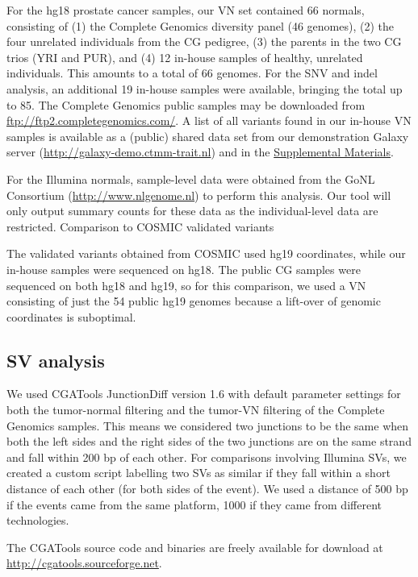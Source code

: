 For the hg18 prostate cancer samples, our VN set contained 66 normals, consisting of (1) the Complete Genomics diversity panel (46 genomes), (2) the four unrelated individuals from the CG pedigree, (3) the parents in the two CG trios (YRI and PUR), and (4) 12 in-house samples of healthy, unrelated individuals. This amounts to a total of 66 genomes. For the SNV and indel analysis, an additional 19 in-house samples were available, bringing the total up to 85. The Complete Genomics public samples may be downloaded from \url{ftp://ftp2.completegenomics.com/}. A list of all variants found in our in-house VN samples is available as a (public) shared data set from our demonstration Galaxy server (\url{http://galaxy-demo.ctmm-trait.nl}) and in the \href{https://genome.cshlp.org/content/25/9/1382/suppl/DC1}{Supplemental Materials}.

For the Illumina normals, sample-level data were obtained from the GoNL Consortium (\url{http://www.nlgenome.nl}) to perform this analysis. Our tool will only output summary counts for these data as the individual-level data are restricted.
Comparison to COSMIC validated variants

The validated variants obtained from COSMIC used hg19 coordinates, while our in-house samples were sequenced on hg18. The public CG samples were sequenced on both hg18 and hg19, so for this comparison, we used a VN consisting of just the 54 public hg19 genomes because a lift-over of genomic coordinates is suboptimal.

\subsection*{SV analysis}

We used CGATools JunctionDiff version 1.6 with default parameter settings for both the tumor-normal filtering and the tumor-VN filtering of the Complete Genomics samples. This means we considered two junctions to be the same when both the left sides and the right sides of the two junctions are on the same strand and fall within 200 bp of each other. For comparisons involving Illumina SVs, we created a custom script labelling two SVs as similar if they fall within a short distance of each other (for both sides of the event). We used a distance of 500 bp if the events came from the same platform, 1000 if they came from different technologies.

The CGATools source code and binaries are freely available for download at \url{http://cgatools.sourceforge.net}.

